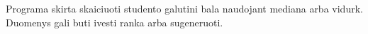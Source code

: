 Programa skirta skaiciuoti studento galutini bala naudojant mediana arba vidurk. Duomenys gali buti ivesti ranka arba sugeneruoti. 